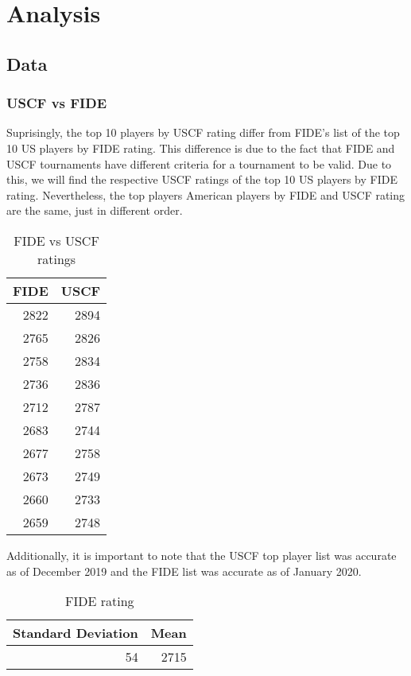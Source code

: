 \documentclass[12pt]{article}
\begin{document}
\section{Analysis}
\subsection{Data}
\subsubsection{USCF vs FIDE}
Suprisingly, the top 10 players by USCF rating differ from FIDE's list of the top 10 US players by FIDE rating. This difference is due to the fact that FIDE and USCF tournaments have different criteria for a tournament to be valid. Due to this, we will find the respective USCF ratings of the top 10 US players by FIDE rating. Nevertheless, the top players American players by FIDE and USCF rating are the same, just in different order.

\begin{table}
\begin{center}
\begin{tabular}{rr}
FIDE & USCF\\
\hline
2822 & 2894\\
2765 & 2826\\
2758 & 2834\\
2736 & 2836\\
2712 & 2787\\
2683 & 2744\\
2677 & 2758\\
2673 & 2749\\
2660 & 2733\\
2659 & 2748\\
\end{tabular}
    \caption{FIDE vs USCF ratings}
\end{center}
\end{table}
Additionally, it is important to note that the USCF top player list was accurate as of December 2019 and the FIDE list was accurate as of January 2020. 


\begin{table}
\begin{center}
\begin{tabular}{rr}
Standard Deviation & Mean\\
\hline
54 & 2715\\
\end{tabular}
    \caption{FIDE rating}
\end{center}
\end{table}
\end{document}
